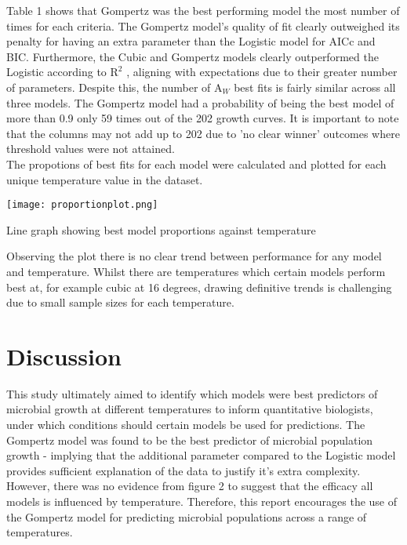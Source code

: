 \documentclass[12pt]{article}
\begin{document}
Table 1 shows that Gompertz was the best performing model the most number of times for each criteria. The Gompertz model's quality of fit clearly outweighed its penalty for having an extra parameter than the Logistic model for AICc and BIC. Furthermore, the Cubic and Gompertz models clearly outperformed the Logistic according to $\mathrm{R}^2$ , aligning with expectations due to their greater number of parameters. Despite this, the number of $\mathrm{A}_{\textit{W}}$ best fits is fairly similar across all three models. The Gompertz model had a probability of being the best model of more than 0.9 only 59 times out of the 202 growth curves. It is important to note that the columns may not add up to 202 due to 'no clear winner' outcomes where threshold values were not attained.\\

The propotions of best fits for each model were calculated and plotted for each unique temperature value in the dataset. 
  \begin{center}
    \texttt{[image: proportionplot.png]} 
    \caption{Line graph showing best model proportions against temperature}
  \end{center}
Observing the plot there is no clear trend between performance for any model and temperature. Whilst there are temperatures which certain models perform best at, for example cubic at 16 degrees, drawing definitive trends is challenging due to small sample sizes for each temperature.

\section{Discussion}

This study ultimately aimed to identify which models were best predictors of microbial growth at different temperatures to inform quantitative biologists, under which conditions should certain models be used for predictions. The Gompertz model was found to be the best predictor of microbial population growth - implying that the additional parameter compared to the Logistic model provides sufficient explanation of the data to justify it's extra complexity. However, there was no evidence from figure 2 to suggest that the efficacy all models is influenced by temperature. Therefore, this report encourages the use of the Gompertz model for predicting microbial populations across a range of temperatures.\\
\end{document}
